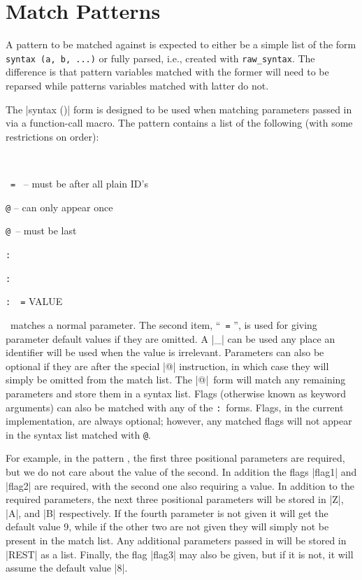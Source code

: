 
\section{Match Patterns}
\label{match_patterns}

A pattern to be matched against is expected to either be a simple list
of the form \verb/syntax (a, b, ...)/ or fully parsed, i.e., created
with \verb/raw_syntax/.  The difference is that pattern variables
matched with the former will need to be reparsed while patterns
variables matched with latter do not.

The |syntax ()| form is designed to be used when matching parameters
passed in via a function-call macro.  The pattern contains a list of
the following (with some restrictions on order):
\begin{itemize*}
\item \ID\
\item \ID\ \verb/=/ \VALUE\ -- must be after all plain ID's
\item \verb/@/ -- can only appear once
\item \verb/@/\ID\ -- must be last
\item \verb/:/\FLAG\
\item \verb/:/\FLAG\ \ID\
\item \verb/:/\FLAG\ \ID\ \verb/=/ VALUE
\end{itemize*}
\ID\ matches a normal parameter.  The second item, ``\ID\ \verb/=/
\VALUE'', is used for giving parameter default values if they are
omitted.  A |_| can be used any place an identifier will be used when
the value is irrelevant.  Parameters can also be optional if they are after the
special |@| instruction, in which case they will simply be omitted
from the match list.  The |@|\ID\ form will match any remaining
parameters and store them in a syntax list.  
Flags (otherwise known as keyword arguments) 
can also be matched with any of the \verb/:/\FLAG\ forms.
Flags, in the current implementation, are always optional; however, any
matched flags will not appear in the syntax list matched with \verb/@/\ID.

For example, in the pattern \snip{(X, \_, Y, Z~=~9, :flag1, :flag2~\_,
  :flag3~F2~=~8, @, A, B, @REST)}, the first three positional
parameters are required, but we do not care about the value of the
second.  In addition the flags |flag1| and |flag2| are required,
with the second one also requiring a value.  In addition to the
required parameters, the next three positional parameters will be
stored in |Z|, |A|, and |B| respectively.  If the fourth parameter is
not given it will get the default value 9, while if the other two are
not given they will simply not be present in the match list.  Any
additional parameters passed in will be stored in |REST| as a list.
Finally, the flag |flag3| may also be given, but if it is not, it
will assume the default value |8|.

